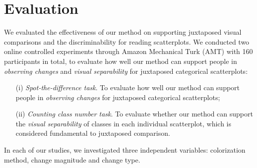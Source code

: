 \section {Evaluation}
\label{sec:results}

We evaluated the effectiveness of our method on supporting juxtaposed visual comparisons and the discriminability for reading scatterplots.%
We conducted two online controlled experiments through Amazon Mechanical Turk (AMT) with 160 participants in total, to evaluate how well our method can support people in \emph{observing changes} and \emph{visual separability} for juxtaposed categorical scatterplots:
\begin{enumerate}
\item [(i)] \emph{Spot-the-difference task}. To evaluate how well our method can support people in \emph{observing changes} for juxtaposed categorical scatterplots;
\item [(ii)] \emph{Counting class number task}. To evaluate whether our method can support the \emph{visual separability} of classes in each individual scatterplot, which is considered fundamental to juxtaposed comparison.
\end{enumerate}

\vspace{.3em}
 In each of our studies, we investigated three independent variables: colorization method, change magnitude and change type.

